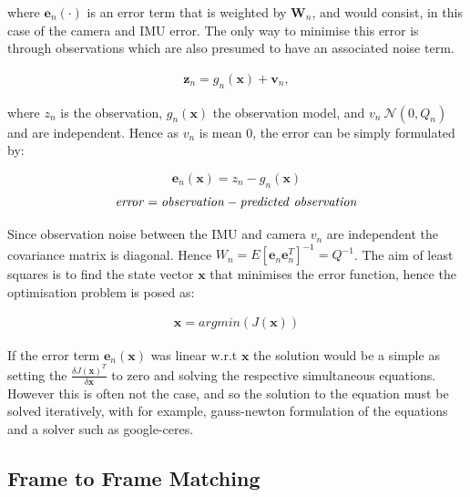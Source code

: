 \documentclass[11pt,twoside]{report}
\begin{document}
where $\textbf{e}_{n}(\cdot)$ is an error term that is weighted by $\textbf{W}_{n}$, and would consist, in this case of the camera and IMU error. The only way to minimise this error is through observations which are also presumed to have an associated noise term.

\begin{equation}
\begin{aligned}
\textbf{z}_{n} = g_{n}(\textbf{x}) + \textbf{v}_{n},
\end{aligned}
\end{equation} 

where $z_{n}$ is the observation, $g_{n}(\textbf{x})$ the observation model, and $v_{n} ~ \mathcal{N}(0,Q_{n})$ and are independent. Hence as $v_{n}$ is mean 0, the error can be simply formulated by:

\begin{equation}
\textbf{e}_{n}(\textbf{x}) = z_{n} - g_{n}(\textbf{x})
\end{equation}
\begin{equation}
\mathit{error = observation - predicted \textnormal{ } observation}
\end{equation}

Since observation noise between the IMU and camera $v_{n}$ are independent the covariance matrix is diagonal. Hence $W_{n} = E[\mathbf{e}_{n} \mathbf{e}_{n}^{T}]^{-1} = Q^{-1}$. The aim of least squares is to find the state vector $\mathbf{x}$ that minimises the error function, hence the optimisation problem is posed as:

\begin{equation}
\begin{aligned}
\textbf{x} = argmin(J(\mathbf{x}))
\end{aligned}
\end{equation}

If the error term $\mathbf{e}_{n}(\mathbf{x})$ was linear w.r.t $\mathbf{x}$ the solution would be a simple as setting the $\frac{\delta J(\mathbf{x})^{T}}{\delta \mathbf{x}}$ to zero and solving the respective simultaneous equations. However this is often not the case, and so the solution to the equation must be solved iteratively, with for example, gauss-newton formulation of the equations and a solver such as google-ceres.

\subsection{Frame to Frame Matching}\label{BRISK_section}
\end{document}
